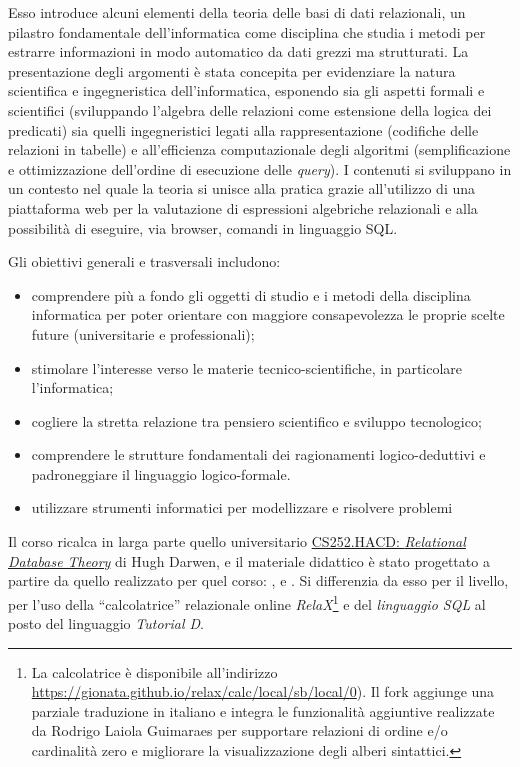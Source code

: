 \documentclass[withtimes]{easychair}
\begin{document}
Esso introduce alcuni elementi della teoria delle basi di dati relazionali, un pilastro fondamentale dell'informatica come disciplina che studia i metodi per estrarre informazioni in modo automatico da dati grezzi ma strutturati. La presentazione degli argomenti è stata concepita per evidenziare la natura scientifica e ingegneristica dell'informatica,  esponendo sia gli aspetti formali e scientifici (sviluppando l'algebra delle relazioni come estensione della logica dei predicati) sia quelli ingegneristici legati alla rappresentazione (codifiche delle relazioni in tabelle) e all'efficienza computazionale degli algoritmi (semplificazione e ottimizzazione dell'ordine di esecuzione delle \emph{query}). I contenuti si sviluppano in un contesto nel quale la teoria si unisce alla pratica grazie all'utilizzo di una piattaforma web per la valutazione di espressioni algebriche relazionali e alla possibilità di eseguire, via browser, comandi in linguaggio SQL.

Gli obiettivi generali e trasversali includono:

\begin{itemize}
 \item comprendere più a fondo gli oggetti di studio e i metodi della disciplina informatica per poter orientare con maggiore consapevolezza le proprie scelte future (universitarie e professionali);
 \item stimolare l'interesse verso le materie tecnico-scientifiche, in particolare l'informatica;
 \item cogliere la stretta relazione tra pensiero scientifico e sviluppo tecnologico;
 \item comprendere le strutture fondamentali dei ragionamenti logico-deduttivi
e padroneggiare il linguaggio logico-formale.
 \item utilizzare strumenti informatici per modellizzare e risolvere problemi
\end{itemize}

Il corso ricalca in larga parte quello universitario \href{https://www.dcs.warwick.ac.uk/~hugh/#CS252}{CS252.HACD:
\emph{Relational Database Theory}} di Hugh Darwen, e il  materiale didattico è stato progettato a partire da quello realizzato per quel corso: \cite{darwen2014introduction}, \cite{darwen2010exercises} e \cite{darwen2011sql}. Si differenzia da esso per il livello, per l'uso della ``calcolatrice'' relazionale online \emph{RelaX}\footnote{La calcolatrice è disponibile all'indirizzo
\url{https://gionata.github.io/relax/calc/local/sb/local/0}). Il fork aggiunge una parziale traduzione in italiano e integra le funzionalità aggiuntive realizzate da Rodrigo Laiola Guimaraes per supportare relazioni di ordine e/o cardinalità zero e migliorare la visualizzazione degli alberi sintattici.} e del \emph{linguaggio SQL} al posto del linguaggio \emph{Tutorial D}.
\end{document}
